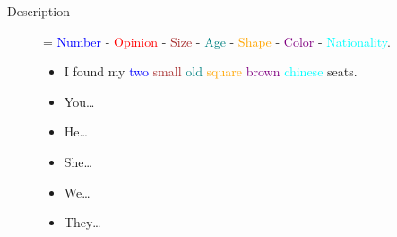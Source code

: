 \begin{multicols}{2}
\begin{description}
\item [Description] = \textcolor{blue}{Number} - \textcolor{red}{Opinion} - \textcolor{brown}{Size} - \textcolor{teal}{Age} - \textcolor{orange}{Shape} - \textcolor{purple}{Color} - \textcolor{cyan}{Nationality}.
\begin{itemize}
\item I found my \textcolor{blue}{two} \textcolor{brown}{small} \textcolor{teal}{old} \textcolor{orange}{square} \textcolor{purple}{brown} \textcolor{cyan}{chinese} seats.
\item You\dots
\item He\dots
\item She\dots
\item We\dots
\item They\dots
\end{itemize}
\end{description}
\end{multicols}